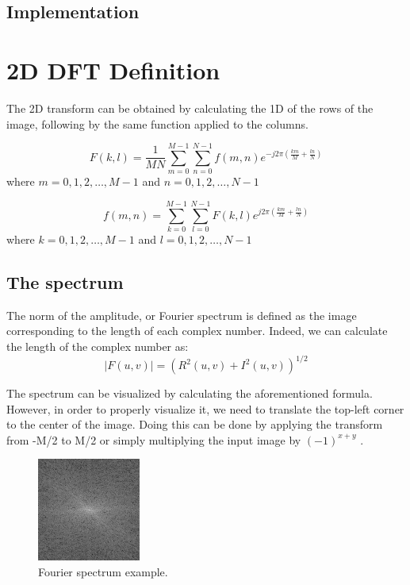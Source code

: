 \documentclass[12pt]{article}
\begin{document}
\subsection{Implementation}

\section{2D DFT Definition}
The 2D transform can be obtained by calculating the 1D of the rows of the image, following by the same function applied to the columns.

\begin{equation}
F(k,l)=\frac{1}{MN}\sum_{m=0}^{M-1}\sum_{n=0}^{N-1} f(m,n) e^{-j 2\pi (\frac{km}{M} + \frac{ln}{N})}
\end{equation}
where $m = 0,1,2,\dots, M-1$ and $n = 0,1,2,\dots, N-1$

\begin{equation}
f(m,n)=\sum_{k=0}^{M-1}\sum_{l=0}^{N-1} F(k,l) e^{j 2\pi (\frac{km}{M} + \frac{ln}{N})}
\end{equation}
where $k = 0,1,2,\dots, M-1$ and $l = 0,1,2,\dots, N-1$

\subsection{The spectrum}
The norm of the amplitude, or Fourier spectrum is defined as the image corresponding to the length of each complex number. Indeed, we can calculate the length of the complex number as:
\begin{equation}
	|F(u,v)|= (R^2(u,v) + I^2(u,v))^{1/2}
\end{equation}

The spectrum can be visualized by calculating the aforementioned formula. However, in order to properly visualize it, we need to translate the top-left corner to the center of the image. Doing this can be done by applying the transform from -M/2 to M/2 or simply multiplying the input image by $(-1)^{x+y}$ \cite{Gonzalez2008}.

\begin{figure}[!htbp]
	\begin{center}
		\leavevmode
		\includegraphics[scale=1]{images/spectrum.png}
		\caption{Fourier spectrum example.}
	\end{center}
\end{figure}
\end{document}
